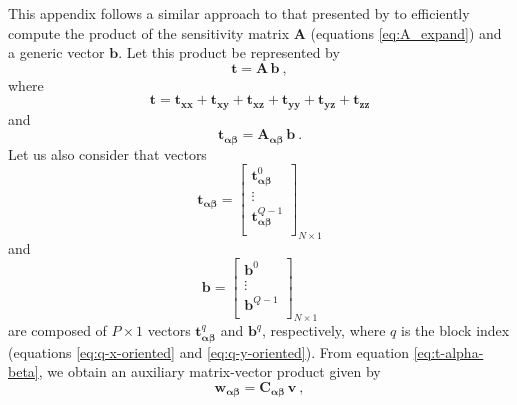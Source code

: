 \documentclass[manuscript,noblind]{geophysics}
\begin{document}
This appendix follows a similar approach to that presented by \citet{takahashi2020convolutional}
to efficiently compute the product of the sensitivity matrix
$\mathbf{A}$ (equations \ref{eq:A_expand}) and a generic vector $\mathbf{b}$. 
Let this product be represented by
\begin{equation}
	\mathbf{t} = 
	\mathbf{A} \, \mathbf{b} \: ,
	\label{eq:t}
\end{equation}
where 
\begin{equation}
	\mathbf{t} = \mathbf{t}_{\boldsymbol{xx}} + \mathbf{t}_{\boldsymbol{xy}} + \mathbf{t}_{\boldsymbol{xz}} +
	\mathbf{t}_{\boldsymbol{yy}} + \mathbf{t}_{\boldsymbol{yz}} + \mathbf{t}_{\boldsymbol{zz}}
	\label{eq:t-components}
\end{equation}
and
\begin{equation}
	\mathbf{t}_{\boldsymbol{\alpha\beta}} = 
	\mathbf{A_{\boldsymbol{\alpha\beta}}} \, \mathbf{b} \: .
	\label{eq:t-alpha-beta}
\end{equation}
Let us also consider that vectors
\begin{equation}
	\mathbf{t}_{\boldsymbol{\alpha\beta}} = \begin{bmatrix}
		\mathbf{t}^{0}_{\boldsymbol{\alpha\beta}} \\
		\vdots \\
		\mathbf{t}^{Q-1}_{\boldsymbol{\alpha\beta}} \\
	\end{bmatrix}_{N \times 1}
	\label{eq:t-alpha-beta-partitioned}
\end{equation} 
and
\begin{equation}
	\mathbf{b} = \begin{bmatrix}
		\mathbf{b}^{0} \\
		\vdots \\
		\mathbf{b}^{Q-1} \\
	\end{bmatrix}_{N \times 1}
	\label{eq:b-partitioned}
\end{equation}
are composed of $P \times 1$ vectors $\mathbf{t}^{q}_{\boldsymbol{\alpha\beta}}$ and $\mathbf{b}^{q}$,
respectively, where $q$ is the block index (equations \ref{eq:q-x-oriented} and \ref{eq:q-y-oriented}). 
From equation \ref{eq:t-alpha-beta}, we obtain an auxiliary matrix-vector product given by
\begin{equation}
	\mathbf{w}_{\boldsymbol{\alpha\beta}} = \mathbf{C}_{\boldsymbol{\alpha\beta}} \, \mathbf{v} \: ,
	\label{eq:w_alpha_beta}
\end{equation}
\end{document}
